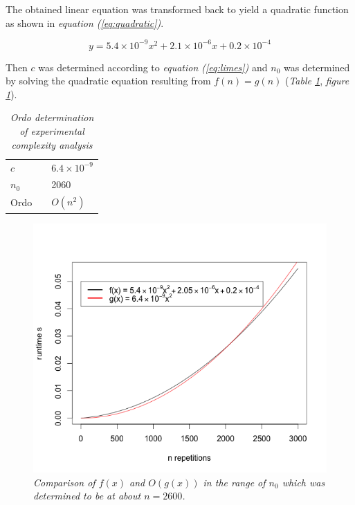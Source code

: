 \documentclass[a4paper,11pt,twoside]{article}
\begin{document}
The obtained linear equation was transformed back to yield a
quadratic function as shown in \textit{equation (\ref{eq:quadratic})}.

\begin{equation} \label{eq:quadratic}
y = 5.4 \times 10^{-9}x^2 + 2.1 \times 10^{-6}x + 0.2 \times 10^{-4}
\end{equation}

Then $c$ was determined according to \textit{equation (\ref{eq:limes})} and
$n_0$ was determined by solving the quadratic equation resulting from
$f(n) = g(n)$ (\textit{Table \ref{tab:ordo}}, \textit{figure \ref{fig:ordo}}). 

\begin{table}[]
\caption{\textit{Ordo determination of experimental complexity analysis}}
\label{tab:ordo}
\begin{tabular}{lll}
$c$      &  & $6.4 \times 10^{-9}$ \\
$n_0$    &  & 2060                 \\
Ordo     &  & $O(n^2)$                
\end{tabular}
\end{table}


\begin{figure} 
\includegraphics[width=\textwidth]{ordo.png}
\caption{\textit{Comparison of $f(x)$ and $O(g(x))$ in the range of $n_{0}$
  which was determined to be at about $n = 2600$.}}
\label{fig:ordo}
\end{figure}
\end{document}
